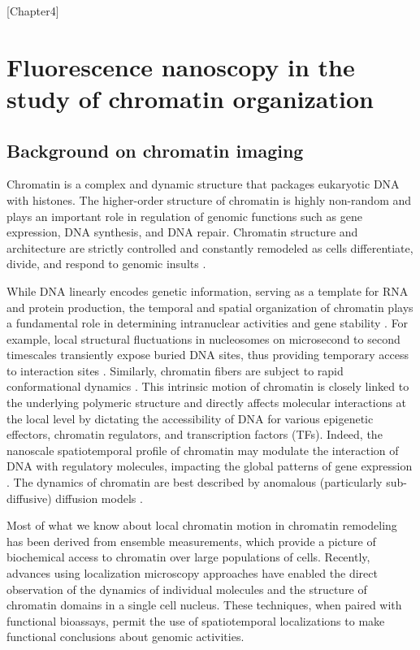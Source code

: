 [Chapter4]

\chapter{Fluorescence nanoscopy in the study of chromatin organization}

\section{Background on chromatin imaging}

Chromatin is a complex and dynamic structure that packages eukaryotic DNA with histones. The higher-order structure of chromatin is highly non-random and plays an important role in regulation of genomic functions such as gene expression, DNA synthesis, and DNA repair. Chromatin structure and architecture are strictly controlled and constantly remodeled as cells differentiate, divide, and respond to genomic insults \parencite{Auerbach2009,Chien2009,Clapier2009,Misteli2007,Vidi2014}.

While DNA linearly encodes genetic information, serving as a template for RNA and protein production, the temporal and spatial organization of chromatin plays a fundamental role in determining intranuclear activities and gene stability \parencite{Cuvier2017,Dion2013}. For example, local structural fluctuations in nucleosomes on microsecond to second timescales transiently expose buried DNA sites, thus providing temporary access to interaction sites \parencite{Choy2012}. Similarly, chromatin fibers are subject to rapid conformational dynamics \parencite{Li2016}. This intrinsic motion of chromatin is closely linked to the underlying polymeric structure and directly affects molecular interactions at the local level by dictating the accessibility of DNA for various epigenetic effectors, chromatin regulators, and transcription factors (TFs). Indeed, the nanoscale spatiotemporal profile of chromatin may modulate the interaction of DNA with regulatory molecules, impacting the global patterns of gene expression \parencite{Bintu2018,Boettiger2016,Grant2018,Xu2018}. The dynamics of chromatin are best described by anomalous (particularly sub-diffusive) diffusion models \parencite{Fierz2019,Shukron2019}.

Most of what we know about local chromatin motion in chromatin remodeling has been derived from ensemble measurements, which provide a picture of biochemical access to chromatin over large populations of cells. Recently, advances using localization microscopy approaches have enabled the direct observation of the dynamics of individual molecules and the structure of chromatin domains in a single cell nucleus. These techniques, when paired with functional bioassays, permit the use of spatiotemporal localizations to make functional conclusions about genomic activities.


